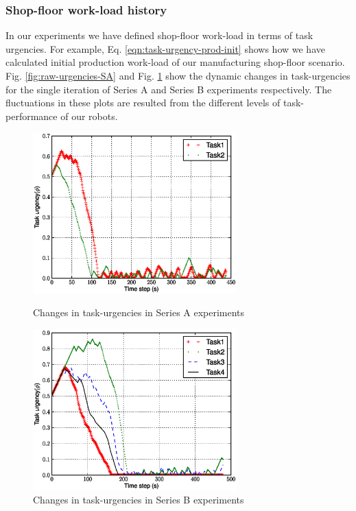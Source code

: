 \documentclass[smallcondensed]{svjour3}
\begin{document}
\subsubsection{Shop-floor work-load history}
In our experiments we have defined shop-floor work-load in terms of task urgencies. For example, Eq. \ref{eqn:task-urgency-prod-init} shows how we have calculated initial production work-load of our manufacturing shop-floor scenario.  Fig. \ref{fig:raw-urgencies-SA} and Fig. \ref{fig:raw-urgencies-SB}  show the dynamic changes in task-urgencies for the single iteration of Series A and Series B experiments respectively. The fluctuations in these plots are resulted from the different levels of task-performance of our robots.
\begin{figure}
\centering
\includegraphics[width=0.7\textwidth, angle=0]
{./PlotUrgencyLog-2010Apr30-095755.eps}
\caption{\small Changes in task-urgencies in Series A experiments}
\label{fig:raw-urgencies-SA} 
\centering
\includegraphics[width=0.7\textwidth, angle=0]{./PlotUrgencyLog-2010May10-115549.eps}
\caption{\small Changes in task-urgencies in Series B experiments} 
\label{fig:raw-urgencies-SB} 
\end{figure}
\end{document}
